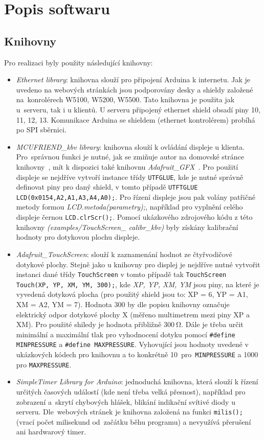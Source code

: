 \section{Popis softwaru}
\subsection{Knihovny}
\label{sec:knihovny}
Pro realizaci byly použity následující knihovny:
\begin{itemize}
  \item \textit{Ethernet library}: knihovna slouží pro připojení Arduina k internetu. Jak je uvedeno na webových stránkách \cite{EthLib} jsou podporovány desky a shieldy založené na~konrolérech W5100, W5200, W5500. Tato knihovna je použita jak u~serveru, tak i u klientů. U serveru připojený ethernet shield obsadí piny 10, 11, 12, 13. Komunikace Arduina se shieldem (ethernet kontrolérem) probíhá po SPI sběrnici.

  \item \textit{MCUFRIEND\_kbv library}: knihovna slouží k ovládání displeje u klienta. Pro~správnou funkci je nutné, jak se zmiňuje autor na domovské stránce knihovny~\cite{lib_MCUFRIEND_kbv},  mít k dispozici také knihovnu \textit{Adafruit\_GFX}~\cite{lib_adafruitGFX}. Pro použití displeje se nejdříve vytvoří instance třídy \texttt{UTFGLUE}, kde je nutné správně definovat piny pro daný shield, v tomto případě \texttt{UTFTGLUE LCD(0x0154,A2,A1,A3,A4,A0);}. Pro řízení displeje jsou pak volány patřičné metody formou \textit{LCD.metoda(parametry);}, například pro vyplnění celého displeje černou \texttt{LCD.clrScr();}. Pomocí ukázkového zdrojového kódu z této knihovny \textit{(examples/TouchScreen\_
calibr\_kbv)} byly získány kalibrační hodnoty pro dotykovou plochu displeje.

  \item \textit{Adafruit\_TouchScreen}: slouží k zaznamenání hodnot ze čtyřvodičové dotykové plochy. Stejně jako u knihovny pro displej je nejdříve nutné vytvořit instanci dané třídy \texttt{TouchScreen} v tomto případě tak \texttt{TouchScreen Touch(XP, YP, XM, YM, 300);}, kde \textit{XP, YP, XM, YM} jsou piny, na které je vyvedená dotyková plocha (pro použitý shield jsou to: XP = 6, YP = A1, XM = A2, YM = 7). Hodnota 300 by dle popisu knihovny \cite{lib_touch} označuje elektrický odpor dotykové plochy X (měřeno multimetrem mezi piny XP a XM). Pro použité shiledy je hodnota přibližně $300  \ \mathrm{\Omega}$. Dále je třeba určit minimální a maximální tlak pro vyhodnocení dotyku pomocí \texttt{\#define MINPRESSURE} a \texttt{\#define MAXPRESSURE}. Vyhovující jsou hodnoty uvedené v ukázkových kódech pro knihovnu a to konkrétně 10~pro~\texttt{MINPRESSURE} a 1000 pro \texttt{MAXPRESSURE}.

  \item \textit{SimpleTimer Library for Arduino}: jednoduchá knihovna, která slouží k řízení určitých časových událostí (kde není třeba velká přesnost), například pro zobrazení a~skrytí chybových hlášek, blikání indikační svítivé diody u serveru. Dle~webových stránek \cite{lib_simpleTimer} je knihovna založená na funkci \texttt{milis();} (vrací počet milisekund od~začátku běhu programu) a nevyužívá přerušení ani hardwarový timer.
\end{itemize}
